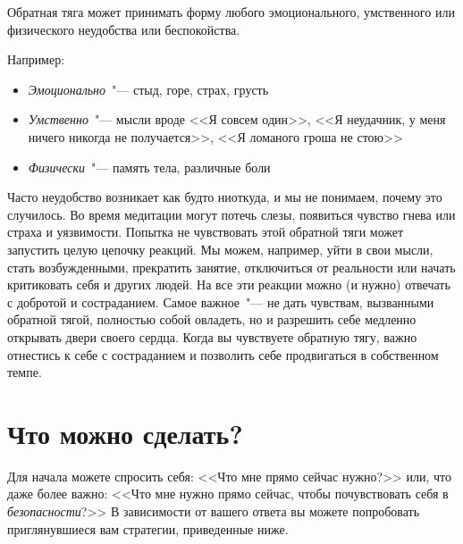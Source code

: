 Обратная тяга может принимать форму любого эмоционального, умственного или физического неудобства или беспокойства. 

Например:
\begin{itemize}
	\item \emph{Эмоционально}~"--- стыд, горе, страх, грусть
	\item \emph{Умственно}~"--- мысли вроде <<Я совсем один>>, <<Я неудачник, у меня ничего никогда не получается>>, <<Я ломаного гроша не стою>>
	\item \emph{Физически}~"--- память тела, различные боли 
\end{itemize}

Часто неудобство возникает как будто ниоткуда, и мы не понимаем, почему это случилось. Во время медитации могут потечь слезы, появиться чувство гнева или страха и уязвимости. Попытка не чувствовать этой обратной тяги может запустить целую цепочку реакций. Мы можем, например, уйти в свои мысли, стать возбужденными, прекратить занятие, отключиться от реальности или начать критиковать себя и других людей. На все эти реакции можно (и нужно) отвечать с добротой и состраданием. Самое важное~"--- не дать чувствам, вызванными обратной тягой, полностью собой овладеть, но и разрешить себе медленно открывать двери своего сердца. Когда вы чувствуете обратную тягу, важно отнестись к себе с состраданием и позволить себе продвигаться в собственном темпе.

\section*{Что можно сделать?} \label{What_Can_We_do_about_backdraft?}

Для начала можете спросить себя: <<Что мне прямо сейчас нужно?>> или, что даже более важно: <<Что мне нужно прямо сейчас, чтобы почувствовать себя в \emph{безопасности}?>> В зависимости от вашего ответа вы можете попробовать приглянувшиеся вам стратегии, приведенные ниже. 

\vspace{2ex}

